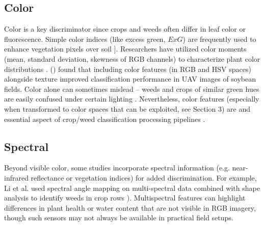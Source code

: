 \documentclass[letterpaper, notitlepage]{report}
\begin{document}
\subsection{Color}
	 Color is a key discriminator since crops and weeds often differ in leaf color or fluorescence. Simple color indices (like excess green, $ExG$) are frequently used to enhance vegetation pixels over soil ]. Researchers have utilized color moments (mean, standard deviation, skewness of RGB channels) to characterize plant color distributions \parencite{Wu2021-gt}.  \citeauthor{Mekhalfa2021-np} (\citeyear{Mekhalfa2021-np}) found that including color features (in RGB and HSV spaces) alongside texture improved classification performance in \gls{UAV} images of soybean fields. Color alone can sometimes mislead – weeds and crops of similar green hues are easily confused under certain lighting \parencite{Wu2021-gt}. Nevertheless, color features (especially when transformed to color spaces that can be exploited, see Section 3) are and essential aspect of crop/weed classification processing pipelines \parencite{Sabzi2020-af}. 
\subsection{Spectral}
	Beyond visible color, some studies incorporate spectral information (e.g. near-infrared reflectance or vegetation indices) for added discrimination. For example, Li et al. used spectral angle mapping on multi-spectral data combined with shape analysis to identify weeds in crop rows \parencite{Wu2021-gt}). Multispectral features can highlight differences in plant health or water content that are not visible in RGB imagery, though such sensors may not always be available in practical field setups.  
\end{document}
